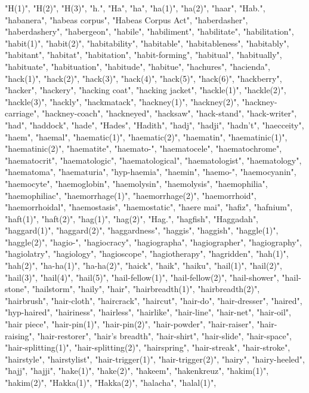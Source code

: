 "H(1)",
"H(2)",
"H(3)",
"h.",
"Ha",
"ha",
"ha(1)",
"ha(2)",
"haar",
"Hab.",
"habanera",
"habeas corpus",
"Habeas Corpus Act",
"haberdasher",
"haberdashery",
"habergeon",
"habile",
"habiliment",
"habilitate",
"habilitation",
"habit(1)",
"habit(2)",
"habitability",
"habitable",
"habitableness",
"habitably",
"habitant",
"habitat",
"habitation",
"habit-forming",
"habitual",
"habitually",
"habituate",
"habituation",
"habitude",
"habitue",
"hachures",
"hacienda",
"hack(1)",
"hack(2)",
"hack(3)",
"hack(4)",
"hack(5)",
"hack(6)",
"hackberry",
"hacker",
"hackery",
"hacking coat",
"hacking jacket",
"hackle(1)",
"hackle(2)",
"hackle(3)",
"hackly",
"hackmatack",
"hackney(1)",
"hackney(2)",
"hackney-carriage",
"hackney-coach",
"hackneyed",
"hacksaw",
"hack-stand",
"hack-writer",
"had",
"haddock",
"hade",
"Hades",
"Hadith",
"hadj",
"hadji",
"hadn't",
"haecceity",
"haem",
"haemal",
"haematic(1)",
"haematic(2)",
"haematin",
"haematinic(1)",
"haematinic(2)",
"haematite",
"haemato-",
"haematocele",
"haematochrome",
"haematocrit",
"haematologic",
"haematological",
"haematologist",
"haematology",
"haematoma",
"haematuria",
"hyp-haemia",
"haemin",
"haemo-",
"haemocyanin",
"haemocyte",
"haemoglobin",
"haemolysin",
"haemolysis",
"haemophilia",
"haemophiliac",
"haemorrhage(1)",
"haemorrhage(2)",
"haemorrhoid",
"haemorrhoidal",
"haemostasis",
"haemostatic",
"haere mai",
"hafiz",
"hafnium",
"haft(1)",
"haft(2)",
"hag(1)",
"hag(2)",
"Hag.",
"hagfish",
"Haggadah",
"haggard(1)",
"haggard(2)",
"haggardness",
"haggis",
"haggish",
"haggle(1)",
"haggle(2)",
"hagio-",
"hagiocracy",
"hagiographa",
"hagiographer",
"hagiography",
"hagiolatry",
"hagiology",
"hagioscope",
"hagiotherapy",
"hagridden",
"hah(1)",
"hah(2)",
"ha-ha(1)",
"ha-ha(2)",
"haick",
"haik",
"haiku",
"hail(1)",
"hail(2)",
"hail(3)",
"hail(4)",
"hail(5)",
"hail-fellow(1)",
"hail-fellow(2)",
"hail-shower",
"hail-stone",
"hailstorm",
"haily",
"hair",
"hairbreadth(1)",
"hairbreadth(2)",
"hairbrush",
"hair-cloth",
"haircrack",
"haircut",
"hair-do",
"hair-dresser",
"haired",
"hyp-haired",
"hairiness",
"hairless",
"hairlike",
"hair-line",
"hair-net",
"hair-oil",
"hair piece",
"hair-pin(1)",
"hair-pin(2)",
"hair-powder",
"hair-raiser",
"hair-raising",
"hair-restorer",
"hair's breadth",
"hair-shirt",
"hair-slide",
"hair-space",
"hair-splitting(1)",
"hair-splitting(2)",
"hairspring",
"hair-streak",
"hair-stroke",
"hairstyle",
"hairstylist",
"hair-trigger(1)",
"hair-trigger(2)",
"hairy",
"hairy-heeled",
"hajj",
"hajji",
"hake(1)",
"hake(2)",
"hakeem",
"hakenkreuz",
"hakim(1)",
"hakim(2)",
"Hakka(1)",
"Hakka(2)",
"halacha",
"halal(1)",

